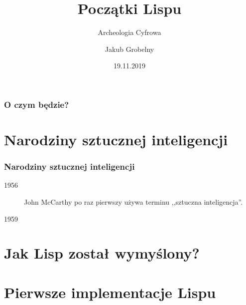 \documentclass{beamer}
\title{Początki Lispu}
\subtitle{Archeologia Cyfrowa}
\author{Jakub Grobelny}
\date{19.11.2019}
\begin{document}

\begin{frame}
\titlepage
\end{frame}

\begin{frame}
\frametitle{O czym będzie?}
\tableofcontents
\end{frame}


\section{Narodziny sztucznej inteligencji}
\begin{frame}
\frametitle{Narodziny sztucznej inteligencji}
\begin{description}
    \item[1956] John McCarthy po raz pierwszy używa terminu ,,sztuczna 
          inteligencja''. \pause
    \item [1959] 
\end{description}

\end{frame}


\section{Jak Lisp został wymyślony?}

\begin{frame}
\end{frame}


\section{Pierwsze implementacje Lispu}
\begin{frame}
\end{frame}

\end{document}
